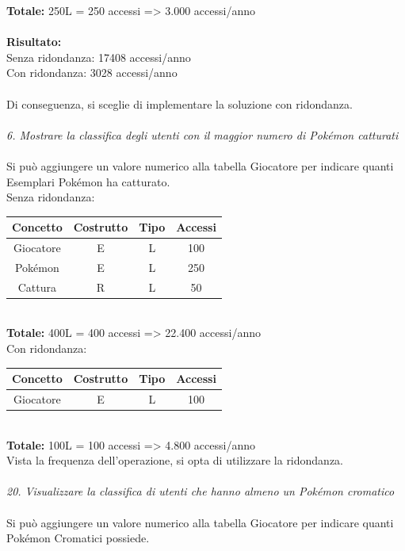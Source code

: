 \documentclass[a4paper,12pt]{report}
\begin{document}
\textbf{Totale:} 250L = 250 accessi => 3.000 accessi/anno \\
\\
\textbf{Risultato:} \\
Senza ridondanza: 17408 accessi/anno \\
Con ridondanza: 3028 accessi/anno \\
\\
Di conseguenza, si sceglie di implementare la soluzione con ridondanza. \\
\\
\textit{6. Mostrare la classifica degli utenti con il maggior numero di Pokémon catturati} \\
\\
Si può aggiungere un valore numerico alla tabella Giocatore per indicare quanti Esemplari Pokémon ha catturato. \\

Senza ridondanza: \\

\begin{tabular}{|c|c|c|c|}
  \hline
  \rowcolor{gray!30}Concetto & Costrutto & Tipo & Accessi \\
  \hline
  Giocatore & E & L & 100 \\
  \hline
  Pokémon & E & L & 250 \\
  \hline
  Cattura & R & L & 50 \\
  \hline
\end{tabular} \\

\textbf{Totale:} 400L = 400 accessi => 22.400 accessi/anno \\

Con ridondanza: \\

\begin{tabular}{|c|c|c|c|}
  \hline
  \rowcolor{gray!30}Concetto & Costrutto & Tipo & Accessi \\
  \hline
  Giocatore & E & L & 100 \\
  \hline
\end{tabular} \\

\textbf{Totale:} 100L = 100 accessi => 4.800 accessi/anno \\

Vista la frequenza dell'operazione, si opta di utilizzare la ridondanza. \\
\\
\textit{20. Visualizzare la classifica di utenti che hanno almeno un Pokémon cromatico} \\
\\
Si può aggiungere un valore numerico alla tabella Giocatore per indicare quanti Pokémon Cromatici possiede. \\
\end{document}
